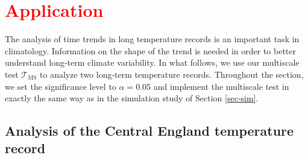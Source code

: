\begin{enumerate}[label=(\alph*),leftmargin=0.7cm]

\end{enumerate}



\section{\textcolor{red}{Application}}\label{sec-data}


The analysis of time trends in long temperature records is an important task in climatology. Information on the shape of the trend is needed in order to better understand long-term climate variability. In what follows, we use our multiscale test $\mathcal{T}_{\text{MS}}$ to analyze two long-term temperature records. Throughout the section, we set the significance level to $\alpha=0.05$ and implement the multiscale test in exactly the same way as in the simulation study of Section \ref{sec-sim}. 


\subsection{Analysis of the Central England temperature record}


